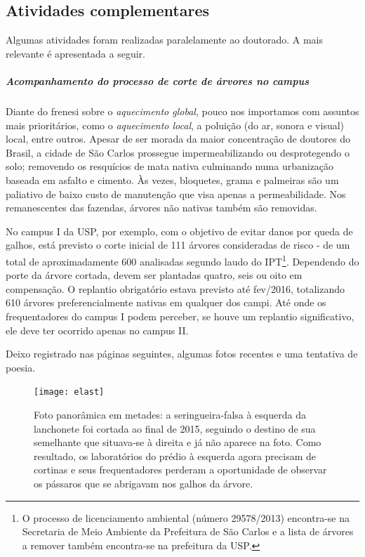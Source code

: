\documentclass[doutorado, pos-defesa, spanish, english, brazil, versalete, sumario=tradicional]{packages/icmc}
\begin{document}
\begin{anexosenv}
\chapter{Atividades complementares}\label{anc}
Algumas atividades foram realizadas paralelamente ao doutorado.
A mais relevante é apresentada a seguir.

\paragraph*{Acompanhamento do processo de corte de árvores no campus}
Diante do frenesi sobre o \textit{aquecimento global}, pouco nos importamos com assuntos mais prioritários, como o \textit{aquecimento local}, a poluição (do ar, sonora e visual) local, entre outros.
Apesar de ser morada da maior concentração de doutores do Brasil, a cidade de São Carlos prossegue impermeabilizando ou desprotegendo o solo; removendo os resquícios de mata nativa culminando numa urbanização baseada em asfalto e cimento.
Às vezes, bloquetes, grama e palmeiras são um paliativo de baixo custo de manutenção que visa apenas a permeabilidade.
Nos remanescentes das fazendas, árvores não nativas também são removidas.

No campus I da USP, por exemplo, com o objetivo de evitar danos por queda de galhos, está previsto o corte inicial de 111 árvores consideradas de risco - de um total de aproximadamente 600 analisadas segundo laudo do IPT\footnote{O processo de licenciamento ambiental (número 29578/2013) encontra-se na Secretaria de Meio Ambiente da Prefeitura de São Carlos e a lista de árvores a remover também encontra-se na prefeitura da USP.}.
Dependendo do porte da árvore cortada, devem ser plantadas quatro, seis ou oito em compensação.
O replantio obrigatório estava previsto até fev/2016, totalizando 610 árvores preferencialmente nativas em qualquer dos campi. Até onde os frequentadores do campus I podem perceber, se houve um replantio significativo, ele deve ter ocorrido apenas no campus II.

Deixo registrado nas páginas seguintes, algumas fotos recentes e uma tentativa de poesia.

\newpage

\begin{landscape}
\begin{figure}
\centering
\texttt{[image: elast]}
\caption*{Foto panorâmica em metades: a seringueira-falsa à esquerda da lanchonete foi cortada ao final de 2015, seguindo o destino de sua semelhante que situava-se à direita e já não aparece na foto. Como resultado, os laboratórios do prédio à esquerda agora precisam de cortinas e seus frequentadores perderam a oportunidade de observar os pássaros que se abrigavam nos galhos da árvore.}
\end{figure}
\end{landscape}


\end{anexosenv}
\end{document}
